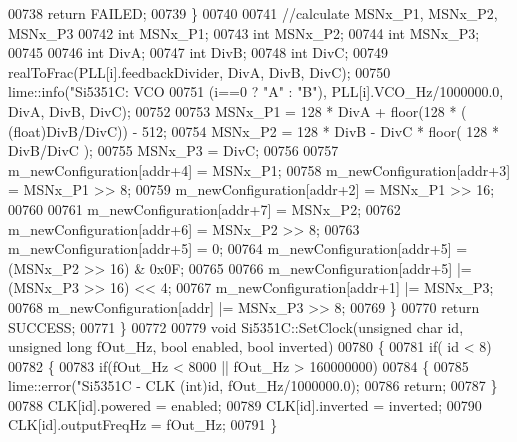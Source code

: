 \begin{DoxyCode}
{{00738             \textcolor{keywordflow}{return} FAILED;
00739         \}
00740 
00741         \textcolor{comment}{//calculate MSNx\_P1, MSNx\_P2, MSNx\_P3}
00742         \textcolor{keywordtype}{int} MSNx\_P1;
00743         \textcolor{keywordtype}{int} MSNx\_P2;
00744         \textcolor{keywordtype}{int} MSNx\_P3;
00745 
00746         \textcolor{keywordtype}{int} DivA;
00747         \textcolor{keywordtype}{int} DivB;
00748         \textcolor{keywordtype}{int} DivC;
00749         realToFrac(PLL[i].feedbackDivider, DivA, DivB, DivC);
00750         lime::info(\textcolor{stringliteral}{"Si5351C: VCO%
00751             (i==0 ? \textcolor{stringliteral}{"A"} : \textcolor{stringliteral}{"B"}), PLL[i].VCO\_Hz/1000000.0, DivA, DivB, DivC);
00752 
00753         MSNx\_P1 = 128 * DivA + floor(128 * ( (\textcolor{keywordtype}{float})DivB/DivC)) - 512;
00754         MSNx\_P2 = 128 * DivB - DivC * floor( 128 * DivB/DivC );
00755         MSNx\_P3 = DivC;
00756 
00757         m\_newConfiguration[addr+4] = MSNx\_P1;
00758         m\_newConfiguration[addr+3] = MSNx\_P1 >> 8;
00759         m\_newConfiguration[addr+2] = MSNx\_P1 >> 16;
00760 
00761         m\_newConfiguration[addr+7] = MSNx\_P2;
00762         m\_newConfiguration[addr+6] = MSNx\_P2 >> 8;
00763         m\_newConfiguration[addr+5] = 0;
00764         m\_newConfiguration[addr+5] = (MSNx\_P2 >> 16) & 0x0F;
00765 
00766         m\_newConfiguration[addr+5] |= (MSNx\_P3 >> 16) << 4;
00767         m\_newConfiguration[addr+1] |= MSNx\_P3;
00768         m\_newConfiguration[addr] |= MSNx\_P3 >> 8;
00769     \}
00770     \textcolor{keywordflow}{return} SUCCESS;
00771 \}
00772 
00779 \textcolor{keywordtype}{void} Si5351C::SetClock(\textcolor{keywordtype}{unsigned} \textcolor{keywordtype}{char} \textcolor{keywordtype}{id}, \textcolor{keywordtype}{unsigned} \textcolor{keywordtype}{long} fOut\_Hz, \textcolor{keywordtype}{bool} enabled, \textcolor{keywordtype}{bool} inverted)
00780 \{
00781     \textcolor{keywordflow}{if}( \textcolor{keywordtype}{id} < 8)
00782     \{
00783         \textcolor{keywordflow}{if}(fOut\_Hz < 8000 || fOut\_Hz > 160000000)
00784         \{
00785             lime::error(\textcolor{stringliteral}{"Si5351C - CLK%
      (\textcolor{keywordtype}{int})\textcolor{keywordtype}{id}, fOut\_Hz/1000000.0);
00786             \textcolor{keywordflow}{return};
00787         \}
00788         CLK[id].powered = enabled;
00789         CLK[id].inverted = inverted;
00790         CLK[id].outputFreqHz = fOut\_Hz;
00791     \}
}}}}
\end{DoxyCode}
